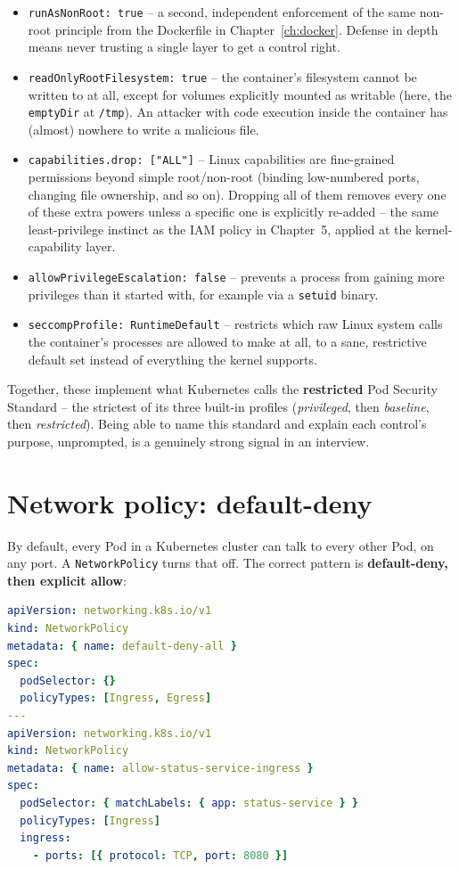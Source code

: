 \documentclass[11pt,twoside,openright]{book}
\begin{document}
\begin{itemize}[leftmargin=2em]
  \item \texttt{runAsNonRoot: true} -- a second, independent enforcement of the same
    non-root principle from the Dockerfile in Chapter~\ref{ch:docker}. Defense in depth
    means never trusting a single layer to get a control right.
  \item \texttt{readOnlyRootFilesystem: true} -- the container's filesystem cannot be
    written to at all, except for volumes explicitly mounted as writable (here, the
    \texttt{emptyDir} at \texttt{/tmp}). An attacker with code execution inside the
    container has (almost) nowhere to write a malicious file.
  \item \texttt{capabilities.drop: ["ALL"]} -- Linux capabilities are fine-grained
    permissions beyond simple root/non-root (binding low-numbered ports, changing file
    ownership, and so on). Dropping all of them removes every one of these extra powers
    unless a specific one is explicitly re-added -- the same least-privilege instinct as
    the IAM policy in Chapter~5, applied at the kernel-capability layer.
  \item \texttt{allowPrivilegeEscalation: false} -- prevents a process from gaining more
    privileges than it started with, for example via a \texttt{setuid} binary.
  \item \texttt{seccompProfile: RuntimeDefault} -- restricts which raw Linux system calls
    the container's processes are allowed to make at all, to a sane, restrictive default
    set instead of everything the kernel supports.
\end{itemize}

Together, these implement what Kubernetes calls the \textbf{restricted} Pod Security
Standard -- the strictest of its three built-in profiles (\emph{privileged}, then
\emph{baseline}, then \emph{restricted}). Being able to name this standard and explain
each control's purpose, unprompted, is a genuinely strong signal in an interview.

\section{Network policy: default-deny}

By default, every Pod in a Kubernetes cluster can talk to every other Pod, on any port. A
\texttt{NetworkPolicy} turns that off. The correct pattern is \textbf{default-deny, then
explicit allow}:

\begin{lstlisting}[language=yaml]
apiVersion: networking.k8s.io/v1
kind: NetworkPolicy
metadata: { name: default-deny-all }
spec:
  podSelector: {}
  policyTypes: [Ingress, Egress]
---
apiVersion: networking.k8s.io/v1
kind: NetworkPolicy
metadata: { name: allow-status-service-ingress }
spec:
  podSelector: { matchLabels: { app: status-service } }
  policyTypes: [Ingress]
  ingress:
    - ports: [{ protocol: TCP, port: 8080 }]
\end{lstlisting}
\end{document}

